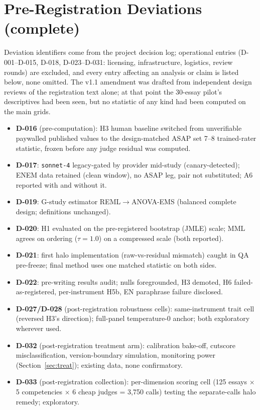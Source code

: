 \documentclass[fleqn,10pt]{JLA_article}
\begin{document}
\section{Pre-Registration Deviations (complete)}
\label{app:dev}
Deviation identifiers come from the project decision log; operational entries (D-001--D-015, D-018, D-023--D-031: licensing, infrastructure, logistics, review rounds) are excluded, and every entry affecting an analysis or claim is listed below, none omitted. The v1.1 amendment was drafted from independent design reviews of the registration text alone; at that point the 30-essay pilot's descriptives had been seen, but no statistic of any kind had been computed on the main grids.
\begin{itemize}
\item \textbf{D-016} (pre-computation): H3 human baseline switched from unverifiable paywalled published values to the design-matched ASAP set 7--8 trained-rater statistic, frozen before any judge residual was computed.
\item \textbf{D-017}: \texttt{sonnet-4} legacy-gated by provider mid-study (canary-detected); ENEM data retained (clean window), no ASAP leg, pair not substituted; A6 reported with and without it.
\item \textbf{D-019}: G-study estimator REML$\to$ANOVA-EMS (balanced complete design; definitions unchanged).
\item \textbf{D-020}: H1 evaluated on the pre-registered bootstrap (JMLE) scale; MML agrees on ordering ($\tau{=}1.0$) on a compressed scale (both reported).
\item \textbf{D-021}: first halo implementation (raw-vs-residual mismatch) caught in QA pre-freeze; final method uses one matched statistic on both sides.
\item \textbf{D-022}: pre-writing results audit; nulls foregrounded, H3 demoted, H6 failed-as-registered, per-instrument H5b, EN paraphrase failure disclosed.
\item \textbf{D-027/D-028} (post-registration robustness cells): same-instrument trait cell (reversed H3's direction); full-panel temperature-0 anchor; both exploratory wherever used.
\item \textbf{D-032} (post-registration treatment arm): calibration bake-off, cutscore misclassification, version-boundary simulation, monitoring power (Section~\ref{sec:treat}); existing data, none confirmatory.
\item \textbf{D-033} (post-registration collection): per-dimension scoring cell (125 essays $\times$ 5 competencies $\times$ 6 cheap judges = 3,750 calls) testing the separate-calls halo remedy; exploratory.
\end{itemize}


\begingroup\renewcommand{\bibliographytypesize}{\scriptsize}

\endgroup
\end{document}
